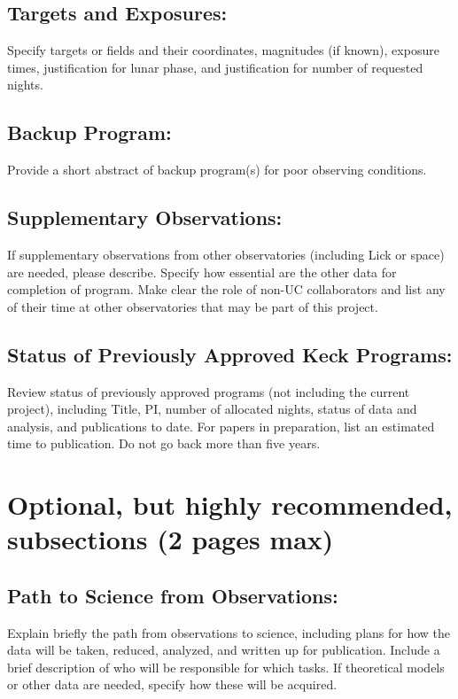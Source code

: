 \documentclass[letter,12pt]{article}
\begin{document}
\subsection{Targets and Exposures:} 
Specify targets or ﬁelds and their coordinates, magnitudes (if known), exposure times, justiﬁcation for lunar phase, and justification for number of requested nights. 

\subsection{Backup Program:}
Provide a short abstract of backup program(s) for poor observing conditions.

\subsection{Supplementary Observations:}
If supplementary observations from other observatories (including Lick or space) are needed, please describe. Specify how essential are the other data for completion of program. Make clear the role of non-UC collaborators and list any of their time at other observatories that may be part of this project.

\subsection{Status of Previously Approved Keck Programs:}
Review status of previously approved programs (not including the current project), including Title, PI, number of allocated nights, status of data and analysis, and publications to date. For papers in preparation, list an estimated time to publication. Do not go back more than five years. 


\section{Optional, but highly recommended, subsections (2 pages max)}

\subsection{Path to Science from Observations:}
Explain brieﬂy the path from observations to science, including plans for how the data will be taken, reduced, analyzed, and written up for publication. Include a brief description of who will be responsible for which tasks. If theoretical models or other data are needed, specify how these will be acquired. 
\end{document}
